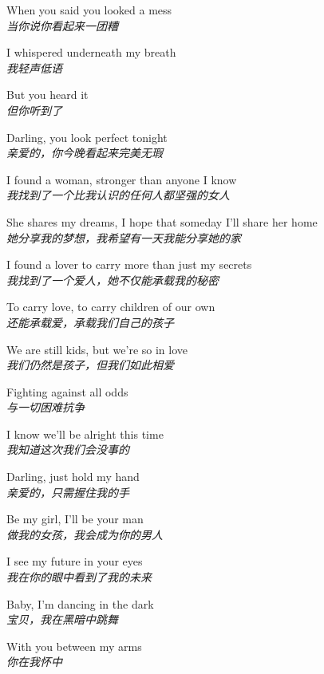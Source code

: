 \begin{spacing}{1.5}
\begin{flushleft}
When you said you looked a mess\\
\textit{当你说你看起来一团糟}\lyricspace

I whispered underneath my breath\\
\textit{我轻声低语}\lyricspace

But you heard it\\
\textit{但你听到了}\lyricspace

Darling, you look perfect tonight\\
\textit{亲爱的，你今晚看起来完美无瑕}\lyricspace

I found a woman, stronger than anyone I know\\
\textit{我找到了一个比我认识的任何人都坚强的女人}\lyricspace

She shares my dreams, I hope that someday I'll share her home\\
\textit{她分享我的梦想，我希望有一天我能分享她的家}\lyricspace

I found a lover to carry more than just my secrets\\
\textit{我找到了一个爱人，她不仅能承载我的秘密}\lyricspace

To carry love, to carry children of our own\\
\textit{还能承载爱，承载我们自己的孩子}\lyricspace

We are still kids, but we're so in love\\
\textit{我们仍然是孩子，但我们如此相爱}\lyricspace

Fighting against all odds\\
\textit{与一切困难抗争}\lyricspace

I know we'll be alright this time\\
\textit{我知道这次我们会没事的}\lyricspace

Darling, just hold my hand\\
\textit{亲爱的，只需握住我的手}\lyricspace

Be my girl, I'll be your man\\
\textit{做我的女孩，我会成为你的男人}\lyricspace

I see my future in your eyes\\
\textit{我在你的眼中看到了我的未来}\lyricspace

Baby, I'm dancing in the dark\\
\textit{宝贝，我在黑暗中跳舞}\lyricspace

With you between my arms\\
\textit{你在我怀中}\lyricspace


\end{flushleft}
\end{spacing}
